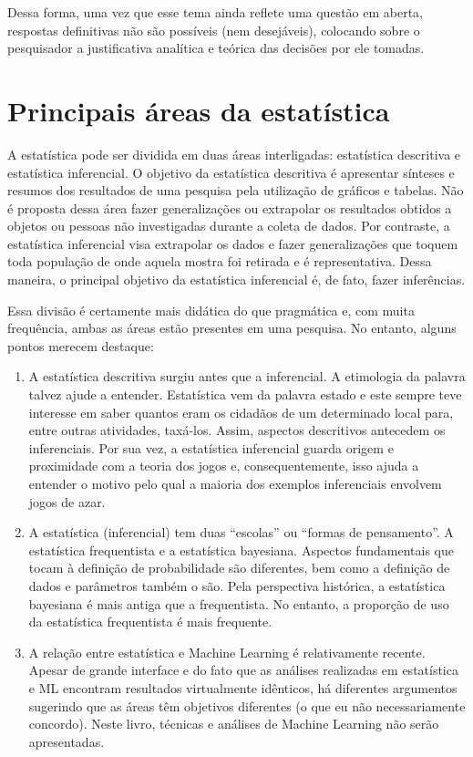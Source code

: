 \documentclass[
]{book}
\begin{document}
Dessa forma, uma vez que esse tema ainda reflete uma questão em aberta,
respostas definitivas não são possíveis (nem desejáveis), colocando
sobre o pesquisador a justificativa analítica e teórica das decisões por
ele tomadas.

\hypertarget{principais-uxe1reas-da-estatuxedstica}{%
\section{Principais áreas da
estatística}\label{principais-uxe1reas-da-estatuxedstica}}

A estatística pode ser dividida em duas áreas interligadas: estatística
descritiva e estatística inferencial. O objetivo da estatística
descritiva é apresentar sínteses e resumos dos resultados de uma
pesquisa pela utilização de gráficos e tabelas. Não é proposta dessa
área fazer generalizações ou extrapolar os resultados obtidos a objetos
ou pessoas não investigadas durante a coleta de dados. Por contraste, a
estatística inferencial visa extrapolar os dados e fazer generalizações
que toquem toda população de onde aquela mostra foi retirada e é
representativa. Dessa maneira, o principal objetivo da estatística
inferencial é, de fato, fazer inferências.

Essa divisão é certamente mais didática do que pragmática e, com muita
frequência, ambas as áreas estão presentes em uma pesquisa. No entanto,
alguns pontos merecem destaque:

\begin{enumerate}
\def\labelenumi{\arabic{enumi}.}
\item
  A estatística descritiva surgiu antes que a inferencial. A etimologia
  da palavra talvez ajude a entender. Estatística vem da palavra estado
  e este sempre teve interesse em saber quantos eram os cidadãos de um
  determinado local para, entre outras atividades, taxá-los. Assim,
  aspectos descritivos antecedem os inferenciais. Por sua vez, a
  estatística inferencial guarda origem e proximidade com a teoria dos
  jogos e, consequentemente, isso ajuda a entender o motivo pelo qual a
  maioria dos exemplos inferenciais envolvem jogos de azar.
\item
  A estatística (inferencial) tem duas ``escolas'' ou ``formas de
  pensamento''. A estatística frequentista e a estatística bayesiana.
  Aspectos fundamentais que tocam à definição de probabilidade são
  diferentes, bem como a definição de dados e parâmetros também o são.
  Pela perspectiva histórica, a estatística bayesiana é mais antiga que
  a frequentista. No entanto, a proporção de uso da estatística
  frequentista é mais frequente.
\item
  A relação entre estatística e Machine Learning é relativamente
  recente. Apesar de grande interface e do fato que as análises
  realizadas em estatística e ML encontram resultados virtualmente
  idênticos, há diferentes argumentos sugerindo que as áreas têm
  objetivos diferentes (o que eu não necessariamente concordo). Neste
  livro, técnicas e análises de Machine Learning não serão apresentadas.
\end{enumerate}
\end{document}
